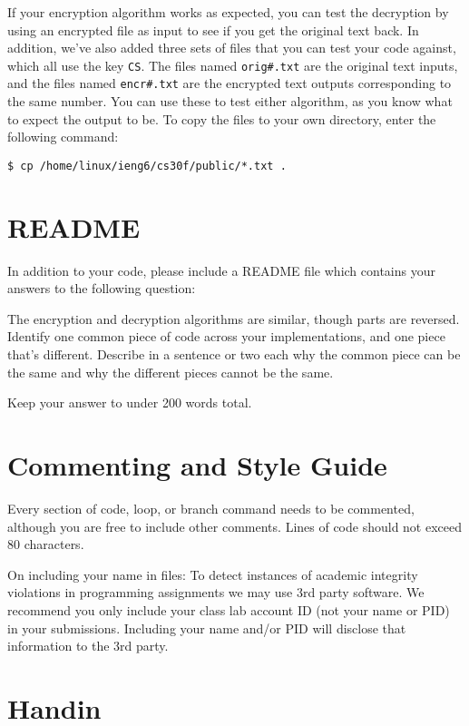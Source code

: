 \documentclass{article}
\begin{document}
If your encryption algorithm works as expected, you can test the decryption by
using an encrypted file as input to see if you get the original text back. In
addition, we've also added three sets of files that you can test your code 
against, which all use the key {\tt CS}. The files named {\tt orig\#.txt} are 
the original text inputs, and the files named {\tt encr\#.txt} are the 
encrypted text outputs corresponding to the same number. You can use these to 
test either algorithm, as you know what to expect the output to be. To copy 
the files to your own directory, enter the following command:

\begin{verbatim}
$ cp /home/linux/ieng6/cs30f/public/*.txt .
\end{verbatim}

\section{README}

In addition to your code, please include a README file which contains your
answers to the following question:

The encryption and decryption algorithms are similar, though parts are
reversed. Identify one common piece of code across your implementations, and
one piece that's different. Describe in a sentence or two each why the common
piece can be the same and why the different pieces cannot be the same.

Keep your answer to under 200 words total.

\section{Commenting and Style Guide}

Every section of code, loop, or branch command needs to be commented, although
you are free to include other comments. Lines of code should not exceed 80
characters.

On including your name in files: To detect instances of academic integrity
violations in programming assignments we may use 3rd party software.  We
recommend you only include your class lab account ID (not your name or PID) in
your submissions.  Including your name and/or PID will disclose that
information to the 3rd party.

\section{Handin}
\end{document}
